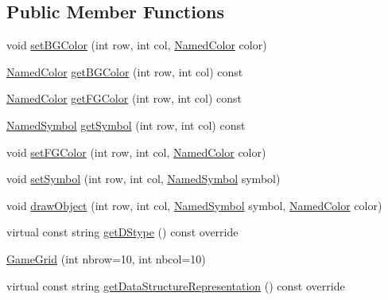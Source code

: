 \subsection*{Public Member Functions}
\begin{DoxyCompactItemize}
\item 
void \hyperlink{classbridges_1_1_game_grid_aa877047d613ace46190c161f0c31a1b3}{set\+B\+G\+Color} (int row, int col, \hyperlink{namespacebridges_ad811207d8898a7fd6b72a74725e68357}{Named\+Color} color)
\item 
\hyperlink{namespacebridges_ad811207d8898a7fd6b72a74725e68357}{Named\+Color} \hyperlink{classbridges_1_1_game_grid_a83edc2bc4a249e4247efa78765ff3901}{get\+B\+G\+Color} (int row, int col) const
\item 
\hyperlink{namespacebridges_ad811207d8898a7fd6b72a74725e68357}{Named\+Color} \hyperlink{classbridges_1_1_game_grid_af67d9a674e35ed54fff39cd4b0c6ce3a}{get\+F\+G\+Color} (int row, int col) const
\item 
\hyperlink{namespacebridges_acfb0a4f7877d8f63de3e6862004c50ed}{Named\+Symbol} \hyperlink{classbridges_1_1_game_grid_a9e3450aae2d92f781b298a5cd0aa5b62}{get\+Symbol} (int row, int col) const
\item 
void \hyperlink{classbridges_1_1_game_grid_aff88dfdc61c69af5881665d937f07ee4}{set\+F\+G\+Color} (int row, int col, \hyperlink{namespacebridges_ad811207d8898a7fd6b72a74725e68357}{Named\+Color} color)
\item 
void \hyperlink{classbridges_1_1_game_grid_a733c0e0cd549248292e08a2dca09637e}{set\+Symbol} (int row, int col, \hyperlink{namespacebridges_acfb0a4f7877d8f63de3e6862004c50ed}{Named\+Symbol} symbol)
\item 
void \hyperlink{classbridges_1_1_game_grid_a6cd5a11ca69e4753760741e27b08d008}{draw\+Object} (int row, int col, \hyperlink{namespacebridges_acfb0a4f7877d8f63de3e6862004c50ed}{Named\+Symbol} symbol, \hyperlink{namespacebridges_ad811207d8898a7fd6b72a74725e68357}{Named\+Color} color)
\item 
virtual const string \hyperlink{classbridges_1_1_game_grid_a668f4f82739798f808a9f0b582d49dac}{get\+D\+Stype} () const override
\item 
\hyperlink{classbridges_1_1_game_grid_ae712634494ca1184d65cff6803d3585d}{Game\+Grid} (int nbrow=10, int nbcol=10)
\item 
virtual const string \hyperlink{classbridges_1_1_game_grid_a5f023a7320cdc35474ab006320d778b4}{get\+Data\+Structure\+Representation} () const override
\end{DoxyCompactItemize}
